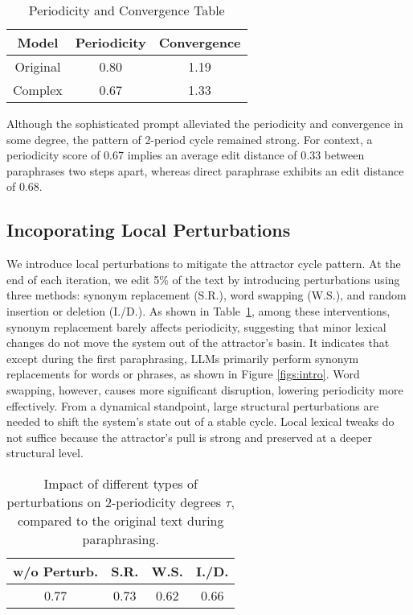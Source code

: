 \begin{table}[h]
\centering
\small
\begin{tabular}{ccc}
\toprule
\textbf{Model} & \textbf{Periodicity} & \textbf{Convergence} \\ \midrule
Original & 0.80 & 1.19 \\
Complex  & 0.67 & 1.33 \\ \bottomrule
\end{tabular}
\caption{Periodicity and Convergence Table}
\end{table}

Although the sophisticated prompt alleviated the periodicity and convergence in some degree, the pattern of 2-period cycle remained strong. For context, a periodicity score of 0.67 implies an average edit distance of 0.33 between paraphrases two steps apart, whereas direct paraphrase exhibits an edit distance of 0.68. 


\subsection{Incoporating Local Perturbations}


We introduce local perturbations to mitigate the attractor cycle pattern. 
At the end of each iteration, we edit 5\% of the text by introducing perturbations using three methods: synonym replacement (S.R.), word swapping (W.S.), and random insertion or deletion (I./D.).
As shown in Table~\ref{table:huamn_interven}, 
among these interventions, synonym replacement barely affects periodicity, suggesting that minor lexical changes do not move the system out of the attractor’s basin. 
It indicates that except during the first paraphrasing, LLMs primarily perform synonym replacements for words or phrases, as shown in Figure \ref{figs:intro}.
Word swapping, however, causes more significant disruption, lowering periodicity more effectively. 
From a dynamical standpoint, large structural perturbations are needed to shift the system’s state out of a stable cycle. 
Local lexical tweaks do not suffice because the attractor’s pull is strong and preserved at a deeper structural level.
\begin{table}[!h]
    \centering
    \small
    \begin{tabular}{cccc}
        \toprule
            \textbf{w/o Perturb.} & \textbf{S.R.} & \textbf{W.S.} & \textbf{I./D.} \\
        \midrule
             0.77 & 0.73 &  0.62 & 0.66 \\
        \bottomrule
    \end{tabular}
    \caption{Impact of different types of perturbations on 2-periodicity degrees $\tau$, compared to the original text during paraphrasing.}
    \label{table:huamn_interven}
\end{table}

